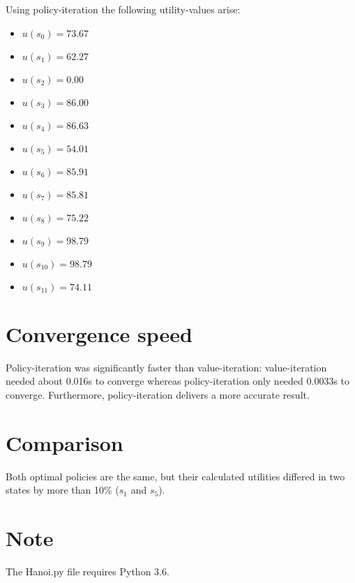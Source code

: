 \documentclass[a4paper]{article}
\begin{document}
\noindent
Using policy-iteration the following utility-values arise:
\begin{multicols}{2}
\begin{itemize}
\item $u(s_0) = 73.67 $
\item $u(s_1) = 62.27 $
\item $u(s_2) = 0.00 $
\item $u(s_3) = 86.00 $
\item $u(s_4) = 86.63 $
\item $u(s_5) = 54.01 $
\item $u(s_6) = 85.91 $
\item $u(s_7) = 85.81 $
\item $u(s_8) = 75.22 $
\item $u(s_9) = 98.79 $
\item $u(s_{10}) = 98.79 $
\item $u(s_{11}) = 74.11 $
\end{itemize}
\end{multicols}

\section{Convergence speed}
Policy-iteration was significantly faster than value-iteration: value-iteration needed about 0.016s to converge whereas policy-iteration only needed 0.0033s to converge. Furthermore, policy-iteration delivers a more accurate result.

\section{Comparison}
Both optimal policies are the same, but their calculated utilities differed in two states by more than 10\% ($s_1$ and $s_5$).

\section{Note}
The Hanoi.py file requires Python 3.6.
\end{document}
